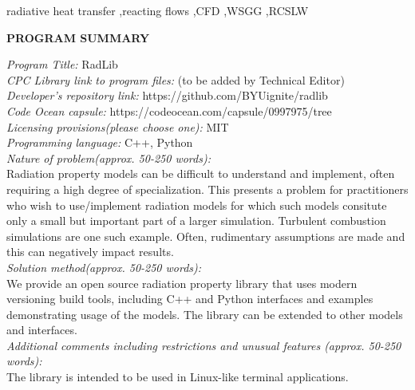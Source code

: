 \documentclass[preprint,12pt]{elsarticle}
\begin{document}
\begin{frontmatter}




\begin{keyword}
radiative heat transfer \sep reacting flows  \sep CFD \sep WSGG \sep RCSLW
\end{keyword}

\end{frontmatter}

\linenumbers


{\bf PROGRAM SUMMARY}

\begin{small}
\noindent
{\em Program Title:} RadLib                                         \\
{\em CPC Library link to program files:} (to be added by Technical Editor) \\
{\em Developer's repository link:} https://github.com/BYUignite/radlib \\
{\em Code Ocean capsule:} https://codeocean.com/capsule/0997975/tree \\
{\em Licensing provisions(please choose one):} MIT \\
{\em Programming language:} C++, Python                                   \\
{\em Nature of problem(approx. 50-250 words):} \\
Radiation property models can be difficult to understand and implement, often requiring a high degree of specialization. This presents a problem for practitioners who wish to use/implement radiation models for which such models consitute only a small but important part of a larger simulation. Turbulent combustion simulations are one such example. Often, rudimentary assumptions are made and this can negatively impact results. \\
{\em Solution method(approx. 50-250 words):}\\
We provide an open source radiation property library that uses modern versioning build tools, including C++ and Python interfaces and examples demonstrating usage of the models. The library can be extended to other models and interfaces. \\ 
{\em Additional comments including restrictions and unusual features (approx. 50-250 words):}\\
The library is intended to be used in Linux-like terminal applications.  
   \\

\end{small}
\end{document}
